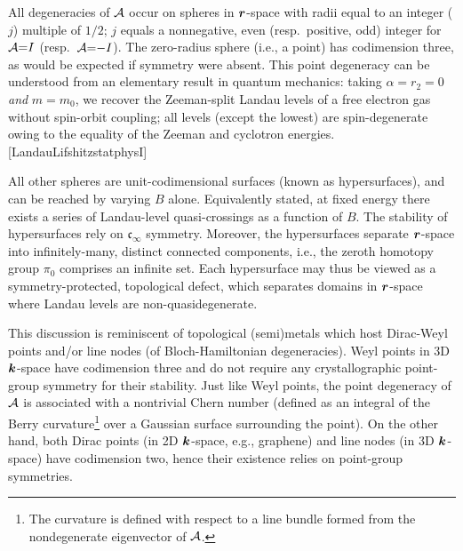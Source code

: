 \documentclass[aps, prb, showpacs, twocolumn, notitlepage, superscriptaddress]{revtex4-1}
\begin{document}

All degeneracies of ${\cal A}$ occur on spheres in $\boldsymbol{r}$-space with radii equal to an integer ($j$)  multiple of $1/2$;  ${j}$ equals a nonnegative, even (resp.\ positive, odd) integer for  ${\cal A}{=}I$ (resp.\ ${\cal A}{=}{-}I$).  The zero-radius sphere (i.e., a point) has codimension three, as would be expected if symmetry were absent.    
This point degeneracy can be understood from an elementary result in quantum mechanics: taking $\alpha{=}r_2{=}0$ \textit{and} $m{=}m_0$, we recover the Zeeman-split Landau levels of a free electron gas without spin-orbit coupling; all levels (except the lowest) are spin-degenerate owing to the equality of the Zeeman and cyclotron energies.[LandauLifshitzstatphysI]  

All other spheres are unit-codimensional surfaces (known as hypersurfaces), and can be reached by varying $B$ alone. Equivalently stated, at fixed energy there exists a series of Landau-level quasi-crossings as a function of $B$. The stability of hypersurfaces rely on  $\mathfrak{c}_{\infty}$ symmetry. Moreover, the hypersurfaces separate $\boldsymbol{r}$-space into infinitely-many, distinct connected components, i.e., the zeroth homotopy group $\pi_0$ comprises an infinite set. Each hypersurface may thus be viewed as a symmetry-protected, topological defect, which separates domains in $\boldsymbol{r}$-space where Landau levels are non-quasidegenerate.   

This discussion is reminiscent of topological (semi)metals which host Dirac-Weyl points and/or line nodes (of Bloch-Hamiltonian degeneracies). Weyl points in 3D $\boldsymbol{k}$-space have codimension three and do not require any crystallographic point-group symmetry for their stability. Just like Weyl points, the point degeneracy of ${\cal A}$ is associated with a nontrivial Chern number (defined as an integral of the Berry curvature\footnote{The curvature is defined with respect to a line bundle formed from the nondegenerate eigenvector of ${\cal A}$.} over a Gaussian surface surrounding the point). On the other hand,  both Dirac points (in 2D $\boldsymbol{k}$-space, e.g., graphene) and  line nodes (in 3D $\boldsymbol{k}$-space) have codimension two, hence their existence relies on point-group symmetries.  
\end{document}
